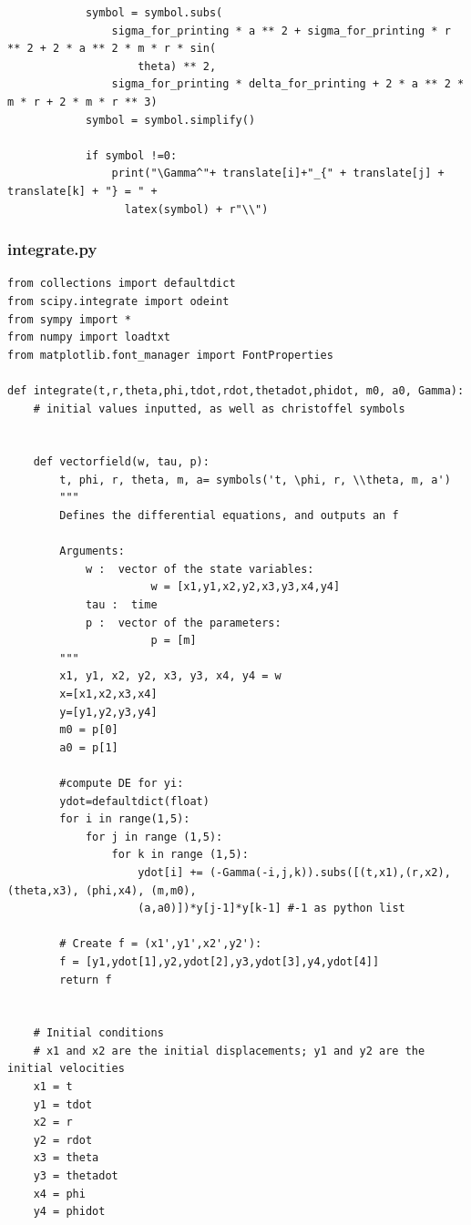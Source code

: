 \documentclass[10pt,a4paper]{report}
\begin{document}
\begin{verbatim}
            symbol = symbol.subs(
                sigma_for_printing * a ** 2 + sigma_for_printing * r ** 2 + 2 * a ** 2 * m * r * sin(
                    theta) ** 2,
                sigma_for_printing * delta_for_printing + 2 * a ** 2 * m * r + 2 * m * r ** 3)
            symbol = symbol.simplify()

            if symbol !=0:
                print("\Gamma^"+ translate[i]+"_{" + translate[j] + translate[k] + "} = " + 
                  latex(symbol) + r"\\")
\end{verbatim}
\normalsize
\subsubsection*{integrate.py}
\small
\begin{verbatim}
from collections import defaultdict
from scipy.integrate import odeint
from sympy import *
from numpy import loadtxt
from matplotlib.font_manager import FontProperties

def integrate(t,r,theta,phi,tdot,rdot,thetadot,phidot, m0, a0, Gamma):
    # initial values inputted, as well as christoffel symbols


    def vectorfield(w, tau, p):
        t, phi, r, theta, m, a= symbols('t, \phi, r, \\theta, m, a')
        """
        Defines the differential equations, and outputs an f

        Arguments:
            w :  vector of the state variables:
                      w = [x1,y1,x2,y2,x3,y3,x4,y4]
            tau :  time
            p :  vector of the parameters:
                      p = [m]
        """
        x1, y1, x2, y2, x3, y3, x4, y4 = w
        x=[x1,x2,x3,x4]
        y=[y1,y2,y3,y4]
        m0 = p[0]
        a0 = p[1]

        #compute DE for yi:
        ydot=defaultdict(float)
        for i in range(1,5):
            for j in range (1,5):
                for k in range (1,5):
                    ydot[i] += (-Gamma(-i,j,k)).subs([(t,x1),(r,x2),(theta,x3), (phi,x4), (m,m0), 
                    (a,a0)])*y[j-1]*y[k-1] #-1 as python list

        # Create f = (x1',y1',x2',y2'):
        f = [y1,ydot[1],y2,ydot[2],y3,ydot[3],y4,ydot[4]]
        return f


    # Initial conditions
    # x1 and x2 are the initial displacements; y1 and y2 are the initial velocities
    x1 = t
    y1 = tdot
    x2 = r
    y2 = rdot
    x3 = theta
    y3 = thetadot
    x4 = phi
    y4 = phidot


\end{verbatim}
\end{document}
